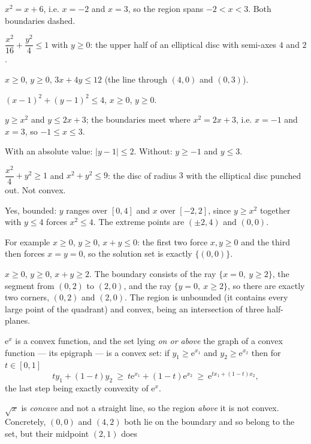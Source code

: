 \begin{solutions}
        $x^{2}=x+6$, i.e. $x=-2$ and $x=3$, so the region spans
        $-2<x<3$. Both boundaries dashed.
  \item $\dfrac{x^{2}}{16}+\dfrac{y^{2}}{4}\le1$ with $y\ge0$: the upper
        half of an elliptical disc with semi-axes $4$ and $2$.
  \item $x\ge0$, \;$y\ge0$, \;$3x+4y\le12$ (the line through $(4,0)$ and
        $(0,3)$).
  \item $(x-1)^{2}+(y-1)^{2}\le4$, \;$x\ge0$, \;$y\ge0$.
  \item $y\ge x^{2}$ and $y\le 2x+3$; the boundaries meet where
        $x^{2}=2x+3$, i.e. $x=-1$ and $x=3$, so $-1\le x\le3$.
  \item With an absolute value: $|y-1|\le2$. Without: $y\ge-1$ and
        $y\le3$.
  \item $\dfrac{x^{2}}{4}+y^{2}\ge1$ \;and\; $x^{2}+y^{2}\le9$: the disc of
        radius $3$ with the elliptical disc punched out. Not convex.
  \item Yes, bounded: $y$ ranges over $[0,4]$ and $x$ over $[-2,2]$, since
        $y\ge x^{2}$ together with $y\le4$ forces $x^{2}\le4$. The extreme
        points are $(\pm2,4)$ and $(0,0)$.
  \item For example $x\ge0$, \;$y\ge0$, \;$x+y\le0$: the first two force
        $x,y\ge0$ and the third then forces $x=y=0$, so the solution set is
        exactly $\{(0,0)\}$.
  \item $x\ge0$, \;$y\ge0$, \;$x+y\ge2$. The boundary consists of the
        ray $\{x=0,\ y\ge2\}$, the segment from $(0,2)$ to $(2,0)$, and the
        ray $\{y=0,\ x\ge2\}$, so there are exactly two corners, $(0,2)$
        and $(2,0)$. The region is unbounded (it contains every large
        point of the quadrant) and convex, being an intersection of three
        half-planes.
  \item $\mathrm{e}^{x}$ is a convex function, and the set lying \emph{on
        or above} the graph of a convex function --- its epigraph --- is a
        convex set: if $y_{1}\ge\mathrm{e}^{x_{1}}$ and
        $y_{2}\ge\mathrm{e}^{x_{2}}$ then for $t\in[0,1]$
        \[
          ty_{1}+(1-t)y_{2}\ \ge\ t\mathrm{e}^{x_{1}}+(1-t)\mathrm{e}^{x_{2}}
          \ \ge\ \mathrm{e}^{tx_{1}+(1-t)x_{2}},
        \]
        the last step being exactly convexity of $\mathrm{e}^{x}$.
  \item $\sqrt{x}$ is \emph{concave} and not a straight line, so the
        region \emph{above} it is not convex. Concretely, $(0,0)$ and $(4,2)$ both lie on the
        boundary and so belong to the set, but their midpoint $(2,1)$ does

\end{solutions}
